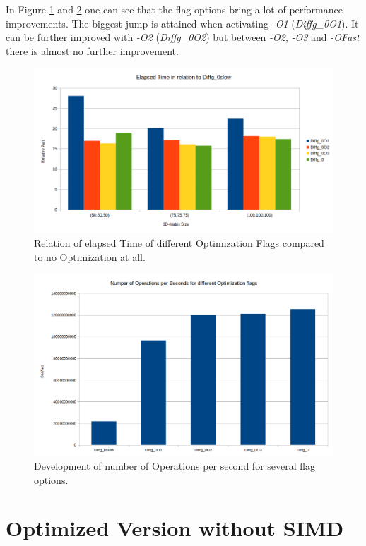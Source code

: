 \documentclass[12pt,a4paper]{article}
\begin{document}
In Figure \ref{fig:Ocompelapsedtime} and \ref{fig:noopssec} one can see that the flag options bring a lot of performance improvements. The biggest jump is attained when activating \emph{-O1} (\emph{Diffg\_0O1}). It can be further improved with \emph{-O2} (\emph{Diffg\_0O2}) but between \emph{-O2}, \emph{-O3} and \emph{-OFast} there is almost no further improvement. 

\begin{figure}
	\centering
	\includegraphics[width=1.0\linewidth]{"Benchmark 3/elapsedtimepercOcomp"}
	\caption{Relation of elapsed Time of different Optimization Flags compared to no Optimization at all.}
	\label{fig:Ocompelapsedtime}
\end{figure}

\begin{figure}
	\centering
	\includegraphics[width=1.0\linewidth]{"Benchmark 3/noopssec"}
	\caption{Development of number of Operations per second for several flag options.  }
	\label{fig:noopssec}
\end{figure}

\section{Optimized Version without SIMD}
\end{document}
